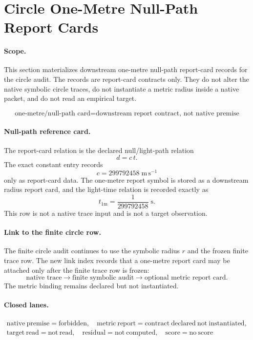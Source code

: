 \section{Circle One-Metre Null-Path Report Cards}

\paragraph{Scope.}
This section materializes downstream one-metre null-path report-card records for the circle audit.  The records are report-card contracts only.  They do not alter the native symbolic circle traces, do not instantiate a metric radius inside a native packet, and do not read an empirical target.

\[
\boxed{\text{one-metre/null-path card}=\text{downstream report contract, not native premise}}
\]

\paragraph{Null-path reference card.}
The report-card relation is the declared null/light-path relation
\[
d=c\,t.
\]
The exact constant entry records
\[
c=299792458\;\mathrm{m\,s^{-1}}
\]
only as report-card data.  The one-metre report symbol is stored as a downstream radius report card, and the light-time relation is recorded exactly as
\[
t_{1\mathrm{m}}=\frac{1}{299792458}\;\mathrm{s}.
\]
This row is not a native trace input and is not a target observation.

\paragraph{Link to the finite circle row.}
The finite circle audit continues to use the symbolic radius $r$ and the frozen finite trace row.  The new link index records that a one-metre report card may be attached only after the finite trace row is frozen:
\[
\text{native trace}\rightarrow\text{finite symbolic audit}\rightarrow\text{optional metric report card}.
\]
The metric binding remains declared but not instantiated.

\paragraph{Closed lanes.}
\[
\boxed{
\begin{array}{c}
\mathrm{native\ premise}=\mathrm{forbidden},\quad
\mathrm{metric\ report}=\mathrm{contract\ declared\ not\ instantiated},\\
\mathrm{target\ read}=\mathrm{not\ read},
\quad \mathrm{residual}=\mathrm{not\ computed},
\quad \mathrm{score}=\mathrm{no\ score}
\end{array}}
\]


